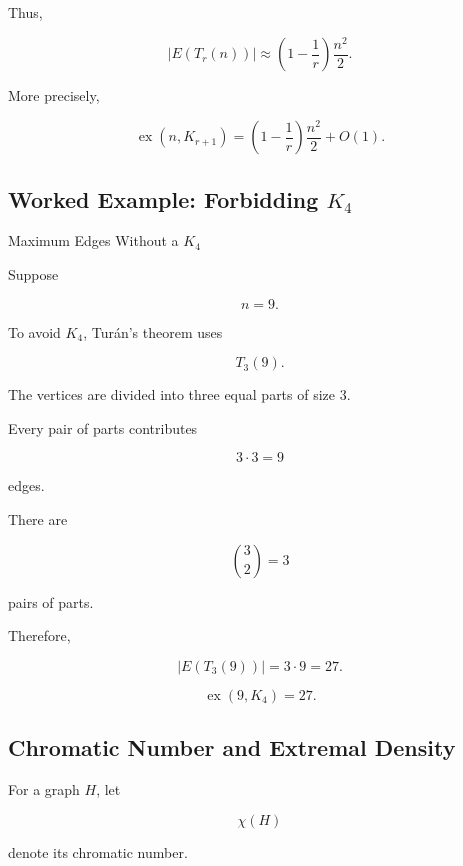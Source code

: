 Thus,

\[
|E(T_r(n))|
\approx
\left(
1-\frac1r
\right)
\frac{n^2}{2}.
\]

More precisely,

\[
\boxed{
\operatorname{ex}(n,K_{r+1})
=
\left(
1-\frac1r
\right)
\frac{n^2}{2}
+
O(1).
}
\]

\subsection{Worked Example: Forbidding \(K_4\)}
\label{subsec:worked-turan-k4}

\begin{workedexamplebox}{Maximum Edges Without a \(K_4\)}

Suppose

\[
n=9.
\]

To avoid \(K_4\), Tur\'an's theorem uses

\[
T_3(9).
\]

The vertices are divided into three equal parts of size \(3\).

Every pair of parts contributes

\[
3\cdot3=9
\]

edges.

There are

\[
\binom32=3
\]

pairs of parts.

Therefore,

\[
|E(T_3(9))|
=
3\cdot9
=
27.
\]

\begin{answerbox}
\[
\boxed{
\operatorname{ex}(9,K_4)=27.
}
\]
\end{answerbox}

\end{workedexamplebox}

\subsection{Chromatic Number and Extremal Density}
\label{subsec:chromatic-number-extremal-density}

For a graph \(H\), let

\[
\chi(H)
\]

denote its chromatic number.

